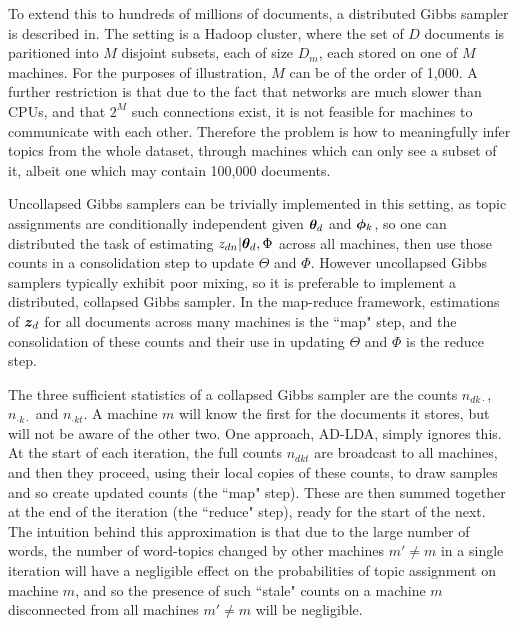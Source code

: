 
To extend this to hundreds of millions of documents, a distributed Gibbs sampler is described in\cite{Newman2009}. The setting is a Hadoop cluster, where the set of $D$ documents is paritioned into $M$ disjoint subsets, each of size $D_m$, each stored on one of $M$ machines. For the purposes of illustration, $M$ can be of the order of 1,000. A further restriction is that due to the fact that networks are much slower than CPUs, and that $2^M$ such connections exist, it is not feasible for machines to communicate with each other. Therefore the problem is how to meaningfully infer topics from the whole dataset, through machines which can only see a subset of it, albeit one which may contain 100,000 documents.

Uncollapsed Gibbs samplers can be trivially implemented in this setting, as topic assignments are conditionally independent given ${ \bm \theta_d }$ and ${ \bm \phi_k }$, so one can distributed the task of estimating $z_{dn} | { \bm \theta_d }, \Phi$ across all machines, then use those counts in a consolidation step to update $\Theta$ and $\Phi$. However uncollapsed Gibbs samplers typically exhibit poor mixing, so it is preferable to implement a distributed, collapsed Gibbs sampler. In the map-reduce framework, estimations of $\bm z_d$ for all documents across many machines is the ``map" step, and the consolidation of these counts and their use in updating $\Theta$ and $\Phi$ is the reduce step.

The three sufficient statistics of a collapsed Gibbs sampler are the counts $n_{dk\cdot}$, $n_{\cdot k \cdot}$ and $n_{\cdot k t}$. A machine $m$ will know the first for the documents it stores, but will not be aware of the other two. One approach, AD-LDA, simply ignores this. At the start of each iteration, the full counts $n_{dkt}$ are broadcast to all machines, and then they proceed, using their local copies of these counts, to draw samples and so create updated counts (the ``map" step). These are then summed together at the end of the iteration (the ``reduce" step), ready for the start of the next. The intuition behind this approximation is that due to the large number of words, the number of word-topics changed by other machines $m' \neq m$ in a single iteration will have a negligible effect on the probabilities of topic assignment on machine $m$, and so the presence of such ``stale" counts on a machine $m$ disconnected from all machines $m' \neq m$ will be negligible.

